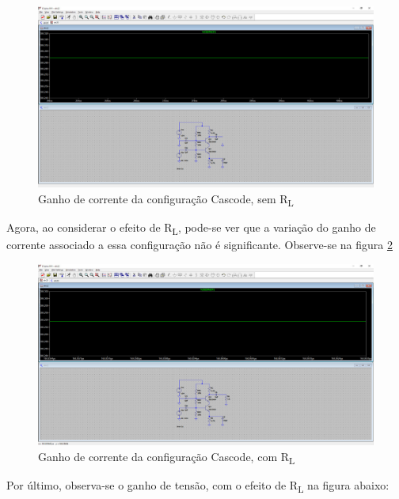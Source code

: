 \documentclass[journal, a4paper]{IEEEtran}
\newcommand\tab[1][1cm]{\hspace*{#1}}
\begin{document}
              \begin{figure}[H]
        		\begin{center}
        		\includegraphics[width=\columnwidth]{beta1.jpeg}
        		\caption{Ganho de corrente da configuração Cascode, sem R\textsubscript{L}}
        		\label{beta1}
        		\end{center}
    	    \end{figure}
        
        \tab Agora, ao considerar o efeito de R\textsubscript{L}, pode-se ver que a variação do ganho de corrente associado a essa configuração não é significante. Observe-se na figura \ref{beta2}

            \begin{figure}[H]
        		\begin{center}
        		\includegraphics[width=\columnwidth]{beta2.jpeg}
        		\caption{Ganho de corrente da configuração Cascode, com R\textsubscript{L}}
        		\label{beta2}
        		\end{center}
    	    \end{figure}
    	 \tab Por último, observa-se o ganho de tensão, com o efeito de R\textsubscript{L} na figura abaixo:
    	
\end{document}
